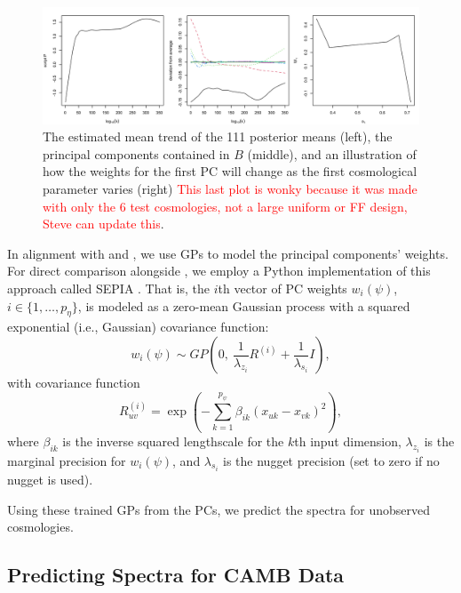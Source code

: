 \documentclass[11pt]{article}
\begin{document}
\begin{figure}
    \centering
    \includegraphics[width=\textwidth]{mean_PCs_oneW.png}
    \caption{The estimated mean trend of the 111 posterior means (left), the principal 
    components contained in $B$ (middle), and an illustration of how the weights 
    for the first PC will change as the first cosmological parameter varies (right) 
    \textcolor{red}{This last plot is wonky because it was made with only the 6 test 
    cosmologies, not a large uniform or FF design, Steve can update this}.}
    \label{fig:mean_PCs_oneW}
\end{figure}



In alignment with \cite{heitmann2009coyote} and \cite{higdon2010estcosmo}, we use 
GPs to model the principal components' weights. For direct comparison alongside
\cite{moran2023mira}, we employ a Python implementation of this approach called 
SEPIA \citep{gattiker2020sepia}. That is, the $i$th vector of PC weights $w_i(\psi)$, 
$i \in \{1,\ldots,p_\eta\}$, is modeled as a zero-mean Gaussian process with a 
squared exponential (i.e., Gaussian) covariance function:
\[
w_i(\psi) \sim GP\left(0,\ \frac{1}{\lambda_{z_i}} R^{(i)} + \frac{1}{\lambda_{s_i}} I \right),
\]
with covariance function
\[
R^{(i)}_{uv} = \exp\left(-\sum_{k=1}^{p_\psi} \beta_{ik} (x_{uk} - x_{vk})^2 \right),
\]
where $\beta_{ik}$ is the inverse squared lengthscale for the $k$th input dimension, $\lambda_{z_i}$ is the marginal precision for $w_i(\psi)$, and $\lambda_{s_i}$ is the nugget precision (set to zero if no nugget is used).

Using these trained GPs from the PCs, we predict the spectra for unobserved cosmologies.

\subsection{Predicting Spectra for CAMB Data}
\label{subsec:camb_pred}
\end{document}

